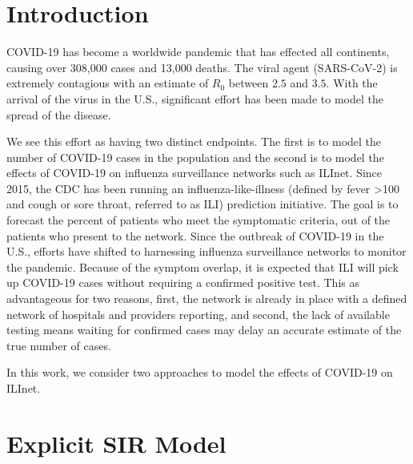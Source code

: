 \documentclass{article}
\title{}
\author{Graham Casey Gibson, Dan Sheldon, Evan Ray, Nicholas Reich }
\begin{document}
\maketitle

\section{Introduction}
COVID-19 has become a worldwide pandemic that has effected all continents, causing over 308,000 cases and 13,000 deaths. The viral agent (SARS-CoV-2) is extremely contagious with an estimate of $R_0$ between $2.5$ and $3.5$. \cite{https://github.com/midas-network/COVID-19/tree/master/parameter_estimates/2019_novel_coronavirus} With the arrival of the virus in the U.S., significant effort has been made to model the spread of the disease.

We see this effort as having two distinct endpoints. The first is to model the number of COVID-19 cases in the population and the second is to model the effects of COVID-19 on influenza surveillance networks such as ILInet. Since 2015, the CDC has been running an influenza-like-illness (defined by fever >100 and cough or sore throat, referred to as ILI) prediction initiative. The goal is to forecast the percent of patients who meet the symptomatic criteria, out of the patients who present to the network. Since the outbreak of COVID-19 in the U.S., efforts have shifted to harnessing influenza surveillance networks to monitor the pandemic. Because of the symptom overlap, it is expected that ILI will pick up COVID-19 cases without requiring a confirmed positive test. This as advantageous for two reasons, first, the network is already in place with a defined network of hospitals and providers reporting, and second, the lack of available testing means waiting for confirmed cases may delay an accurate estimate of the true number of cases. 

In this work, we consider two approaches to model the effects of COVID-19 on ILInet. 
\section{Explicit SIR Model}
\begin{center}
\end{center}
\end{document}
